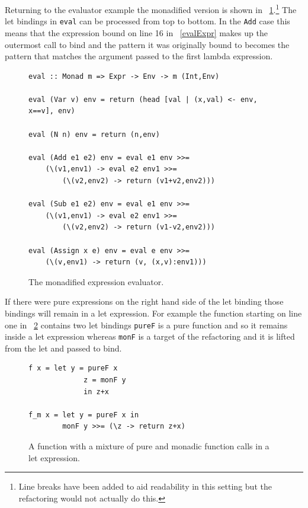 Returning to the evaluator example the monadified version is shown in \DIFdelbegin {}\DIFdelend \DIFaddbegin {}\DIFaddend ~\ref{monEval}.\footnote{Line breaks have been added to aid readability in this setting but the refactoring would not actually do this.} The let bindings in \texttt{eval} can be processed from top to bottom. In the \texttt{Add} case this means that the expression bound on line 16 in \DIFdelbegin {}\DIFdelend \DIFaddbegin {}\DIFaddend ~\ref{evalExpr} makes up the outermost call to bind and the pattern it was originally bound to becomes the pattern that matches the argument passed to the first lambda expression. 
\begin{figure}[t]
\begin{lstlisting}
eval :: Monad m => Expr -> Env -> m (Int,Env)

eval (Var v) env = return (head [val | (x,val) <- env, x==v], env)

eval (N n) env = return (n,env)

eval (Add e1 e2) env = eval e1 env >>= 
	(\(v1,env1) -> eval e2 env1 >>= 
		(\(v2,env2) -> return (v1+v2,env2)))

eval (Sub e1 e2) env = eval e1 env >>= 
	(\(v1,env1) -> eval e2 env1 >>= 
		(\(v2,env2) -> return (v1-v2,env2)))

eval (Assign x e) env = eval e env >>= 
	(\(v,env1) -> return (v, (x,v):env1)))
\end{lstlisting}
\caption{The monadified expression evaluator.}
\label{monEval}
\end{figure}

If there were pure expressions on the right hand side of the let binding those bindings will remain in a let expression. For example the function starting on line one in \DIFdelbegin {}\DIFdelend \DIFaddbegin {}\DIFaddend ~\ref{mixLet} contains two let bindings \texttt{pureF} is a pure function and so it remains inside \DIFdelbegin {}\DIFdelend a let expression whereas \texttt{monF} is a target of the refactoring and it is lifted from the let and passed to bind. 

\begin{figure}[t]
\begin{lstlisting}
f x = let y = pureF x
             z = monF y
		     in z+x

f_m x = let y = pureF x in
		monF y >>= (\z -> return z+x)
\end{lstlisting}
\caption{A function with a mixture of pure and monadic function calls in a let expression.}
\label{mixLet}
\end{figure}

